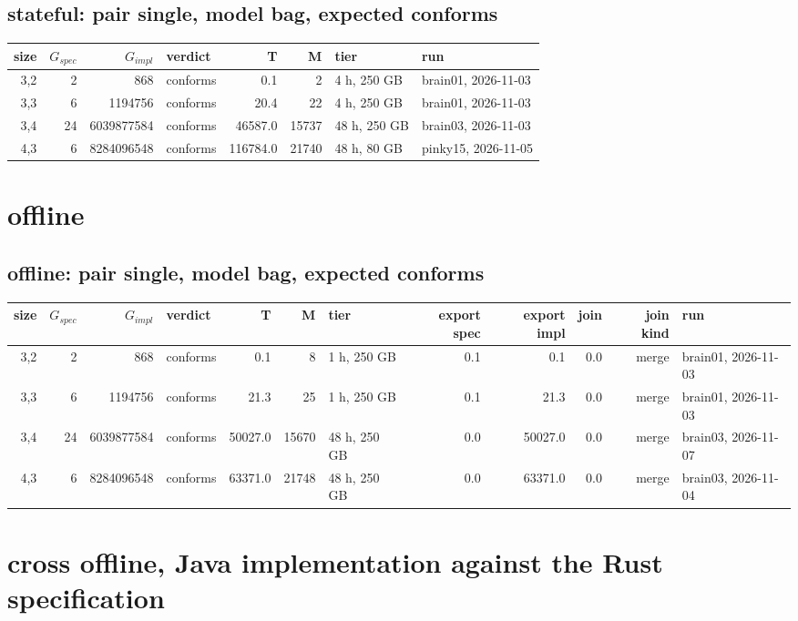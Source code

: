 \documentclass[10pt]{article}
\begin{document}
\subsection*{stateful: pair \textsf{single}, model bag, expected conforms}
\begin{longtable}{@{}rrrlrrll@{}}
\toprule
size & $G_{\mathit{spec}}$ & $G_{\mathit{impl}}$ & verdict & T & M & tier & run \\
\midrule
\endhead
\color{blue} 3,2 & 2 & 868 & conforms & 0.1 & 2 & 4 h, 250 GB & brain01, 2026-11-03 \\
\color{blue} 3,3 & 6 & 1194756 & conforms & 20.4 & 22 & 4 h, 250 GB & brain01, 2026-11-03 \\
\color{blue} 3,4 & 24 & 6039877584 & conforms & 46587.0 & 15737 & 48 h, 250 GB & brain03, 2026-11-03 \\
\color{blue} 4,3 & 6 & 8284096548 & conforms & 116784.0 & 21740 & 48 h, 80 GB & pinky15, 2026-11-05 \\
\bottomrule
\end{longtable}
\section*{offline}
\subsection*{offline: pair \textsf{single}, model bag, expected conforms}
\begin{longtable}{@{}rrrlrrlrrrrl@{}}
\toprule
size & $G_{\mathit{spec}}$ & $G_{\mathit{impl}}$ & verdict & T & M & tier & export spec & export impl & join & join kind & run \\
\midrule
\endhead
\color{blue} 3,2 & 2 & 868 & conforms & 0.1 & 8 & 1 h, 250 GB & 0.1 & 0.1 & 0.0 & merge & brain01, 2026-11-03 \\
\color{blue} 3,3 & 6 & 1194756 & conforms & 21.3 & 25 & 1 h, 250 GB & 0.1 & 21.3 & 0.0 & merge & brain01, 2026-11-03 \\
\color{blue} 3,4 & 24 & 6039877584 & conforms & 50027.0 & 15670 & 48 h, 250 GB & 0.0 & 50027.0 & 0.0 & merge & brain03, 2026-11-07 \\
\color{blue} 4,3 & 6 & 8284096548 & conforms & 63371.0 & 21748 & 48 h, 250 GB & 0.0 & 63371.0 & 0.0 & merge & brain03, 2026-11-04 \\
\bottomrule
\end{longtable}
\section*{cross offline, Java implementation against the Rust specification}
\end{document}
